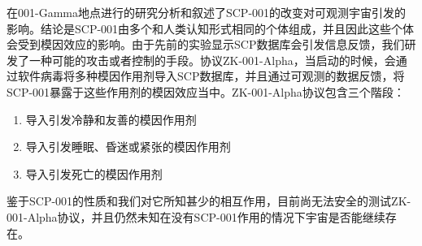 在001-Gamma地点进行的研究分析和叙述了SCP-001的改变对可观测宇宙引发的影响。结论是SCP-001由多个和人类认知形式相同的个体组成，并且因此这些个体会受到模因效应的影响。由于先前的实验显示SCP数据库会引发信息反馈，我们研发了一种可能的攻击或者控制的手段。协议ZK-001-Alpha，当启动的时候，会通过软件病毒将多种模因作用剂导入SCP数据库，并且通过可观测的数据反馈，将SCP-001暴露于这些作用剂的模因效应当中。ZK-001-Alpha协议包含三个階段：

\begin{enumerate}
	\item 导入引发冷静和友善的模因作用剂
	\item 导入引发睡眠、昏迷或紧张的模因作用剂
	\item 导入引发死亡的模因作用剂
\end{enumerate}

鉴于SCP-001的性质和我们对它所知甚少的相互作用，目前尚无法安全的测试ZK-001-Alpha协议，并且仍然未知在没有SCP-001作用的情况下宇宙是否能继续存在。
